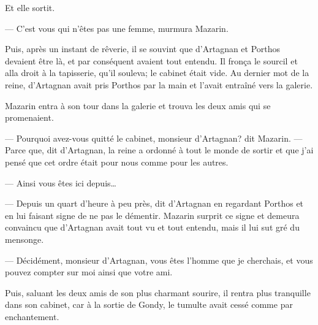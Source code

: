 Et elle sortit.

— C'est vous qui n'êtes pas une femme, murmura Mazarin.

Puis, après un instant de rêverie, il se souvint que d'Artagnan et Porthos devaient être là, et par conséquent avaient tout entendu.
Il fronça le sourcil et alla droit à la tapisserie, qu'il souleva; le cabinet était vide.
Au dernier mot de la reine, d'Artagnan avait pris Porthos par la main et l'avait entraîné vers la galerie.

Mazarin entra à son tour dans la galerie et trouva les deux amis qui se promenaient.

— Pourquoi avez-vous quitté le cabinet, monsieur d'Artagnan? dit Mazarin.
— Parce que, dit d'Artagnan, la reine a ordonné à tout le monde de sortir et que j'ai pensé que cet ordre était pour nous comme pour les autres.

— Ainsi vous êtes ici depuis\dots

— Depuis un quart d'heure à peu près, dit d'Artagnan en regardant Porthos et en lui faisant signe de ne pas le démentir.
Mazarin surprit ce signe et demeura convaincu que d'Artagnan avait tout vu et tout entendu, mais il lui sut gré du mensonge.

— Décidément, monsieur d'Artagnan, vous êtes l'homme que je cherchais, et vous pouvez compter sur moi ainsi que votre ami.

Puis, saluant les deux amis de son plus charmant sourire, il rentra plus tranquille dans son cabinet, car à la sortie de Gondy, le tumulte avait cessé comme par enchantement.